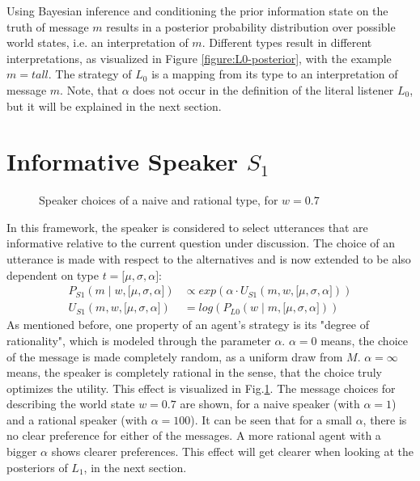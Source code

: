 Using Bayesian inference and conditioning the prior information state on the truth of message $m$ results in a posterior probability distribution over possible world states, i.e. an interpretation of $m$. Different types result in different interpretations, as visualized in Figure \ref{figure:L0-posterior}, with the example $m = tall$. 
The strategy of $L_0$ is a mapping from its type to an interpretation of message $m$. 
Note, that $\alpha$ does not occur in the definition of the literal listener $L_0$, but it will be explained in the next section. 

\section{Informative Speaker $S_1$}
\begin{figure}[h]
 	\centering
	\qquad \qquad
 \caption{Speaker choices of a naive and rational type, for $w=0.7$}
 \label{figure:S1-posterior}
\end{figure}
In this framework, the speaker is considered to select utterances that are informative relative to the current question under discussion. The choice of an utterance is made with respect to the alternatives and is now extended to be also dependent on type $t = \big[ \mu, \sigma, \alpha\big]$:
\begin{align}
P_{S1}(m \mid w, \big[ \mu, \sigma, \alpha\big]) &\propto exp(\alpha \cdot U_{S1}(m,w, \big[ \mu, \sigma, \alpha\big]))\\
U_{S1}(m, w, \big[ \mu, \sigma, \alpha\big]) &= log(P_{L0}(w \mid m, \big[ \mu, \sigma, \alpha\big]))
\end{align}
As mentioned before, one property of an agent's  strategy is its "degree of rationality", which is modeled through the parameter $\alpha$. $\alpha=0$ means, the choice of the message is made completely random, as a uniform draw from $M$. $\alpha=\infty$ means, the speaker is completely rational in the sense, that the choice truly optimizes the utility. This effect is visualized in Fig.\ref{figure:S1-posterior}. The message choices for describing the world state $w=0.7$ are shown, for a naive speaker (with $\alpha=1$) and a rational speaker (with $\alpha=100$). It can be seen that for a small $\alpha$, there is no clear preference for either of the messages. A more rational agent with a bigger $\alpha$ shows clearer preferences. This effect will get clearer when looking at the posteriors of $L_1$, in the next section.

